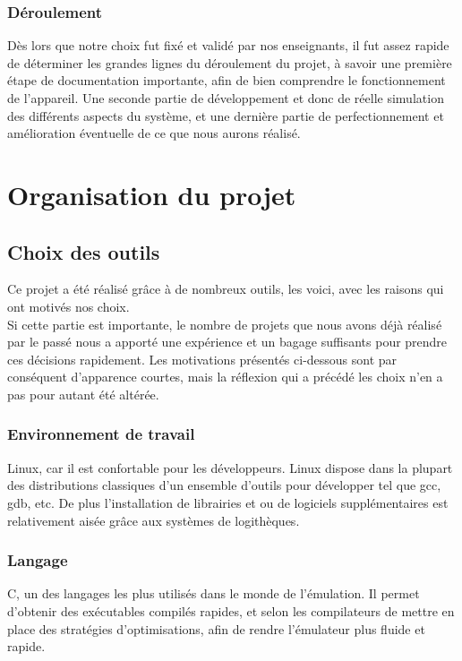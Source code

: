 \documentclass{report}
\begin{document}
\subsection{Déroulement}
	Dès lors que notre choix fut fixé et validé par nos enseignants, il
	fut assez rapide de déterminer les grandes lignes du déroulement du
	projet, à savoir une première étape de documentation importante, afin
	de bien comprendre le fonctionnement de l'appareil. Une seconde partie
	de développement et donc de réelle simulation des différents aspects
	du système, et une dernière partie de perfectionnement et
	amélioration éventuelle de ce que nous aurons réalisé.

\chapter{Organisation du projet}
\section{Choix des outils}
Ce projet a été réalisé grâce à de nombreux outils, les voici, avec les raisons qui ont motivés nos choix.\\
Si cette partie est importante, le nombre de projets que nous avons déjà réalisé par le passé nous a apporté une expérience et un bagage suffisants pour prendre ces décisions rapidement. Les motivations présentés ci-dessous sont par conséquent d'apparence courtes, mais la réflexion qui a précédé les choix n'en a pas pour autant été altérée.

\subsection{Environnement de travail}
Linux, car il est confortable pour les développeurs. Linux dispose dans la plupart des distributions classiques d'un ensemble d'outils pour développer tel que gcc, gdb, etc. De plus l'installation de librairies et ou de logiciels supplémentaires est relativement aisée grâce aux systèmes de logithèques.

\subsection{Langage}
C, un des langages les plus utilisés dans le monde de l'émulation. Il permet d'obtenir des exécutables compilés rapides, et selon les compilateurs de mettre en place des stratégies d'optimisations, afin de rendre l'émulateur plus fluide et rapide.
\end{document}
